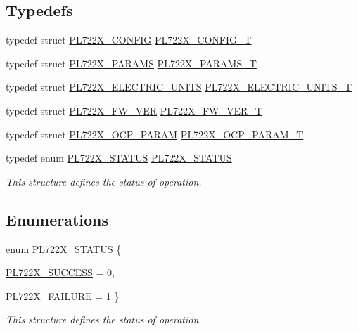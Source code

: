 \subsection*{Typedefs}
\begin{DoxyCompactItemize}
\item 
typedef struct \hyperlink{a00449}{PL722X\_\-CONFIG} \hyperlink{a00486_aabd9b2f1a89e02b31d332b04e11d68f4}{PL722X\_\-CONFIG\_\-T}
\item 
typedef struct \hyperlink{a00453}{PL722X\_\-PARAMS} \hyperlink{a00486_a821a0c1a5a145063f260d31fad400bd4}{PL722X\_\-PARAMS\_\-T}
\item 
typedef struct \hyperlink{a00450}{PL722X\_\-ELECTRIC\_\-UNITS} \hyperlink{a00486_a3641c98c6f3726ae5c6e148503dc2993}{PL722X\_\-ELECTRIC\_\-UNITS\_\-T}
\item 
typedef struct \hyperlink{a00451}{PL722X\_\-FW\_\-VER} \hyperlink{a00486_ac4e944f981c07b278a56ef938f76735d}{PL722X\_\-FW\_\-VER\_\-T}
\item 
typedef struct \hyperlink{a00452}{PL722X\_\-OCP\_\-PARAM} \hyperlink{a00486_a2d33321bbdef2f4ed4a14fa4c375a1ad}{PL722X\_\-OCP\_\-PARAM\_\-T}
\item 
typedef enum \hyperlink{a00486_a2bb5dcead34a0fa5b7fca8986b66fa8c}{PL722X\_\-STATUS} \hyperlink{a00486_ac4ecf097ed33a9b5d098d1ea1235d6ad}{PL722X\_\-STATUS}
\begin{DoxyCompactList}\small\item\em This structure defines the status of operation. \end{DoxyCompactList}\end{DoxyCompactItemize}
\subsection*{Enumerations}
\begin{DoxyCompactItemize}
\item 
enum \hyperlink{a00486_a2bb5dcead34a0fa5b7fca8986b66fa8c}{PL722X\_\-STATUS} \{ \par
\hyperlink{a00486_a2bb5dcead34a0fa5b7fca8986b66fa8ca7690dbe3630b18aed1cdb482e3a53d03}{PL722X\_\-SUCCESS} =  0, 
\par
\hyperlink{a00486_a2bb5dcead34a0fa5b7fca8986b66fa8ca2259fb3fc39982ea86e9749c3f363c6a}{PL722X\_\-FAILURE} =  1
 \}
\begin{DoxyCompactList}\small\item\em This structure defines the status of operation. \end{DoxyCompactList}\end{DoxyCompactItemize}
